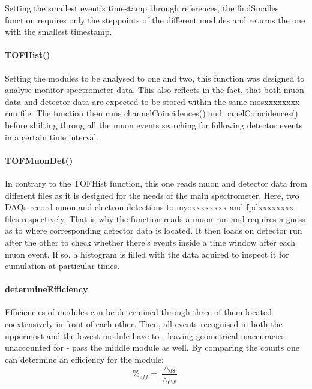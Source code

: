     Setting the smallest event's timestamp through references, the findSmalles function requires only the steppoints of the different modules and returns the one with the smallest timestamp. 
    
    \paragraph{TOFHist()}
    \label{ch:Analysis software:sec:methods of the class run:subsec:TOFHist()}
    
    Setting the modules to be analysed to one and two, this function was designed to analyse monitor spectrometer data. This also reflects in the fact, that both muon data and detector data are expected to be stored within the same mosxxxxxxxx run file. The function then runs channelCoincidences() and panelCoincidences() before shifting throug all the muon events searching for following detector events in a certain time interval.
    
    \paragraph{TOFMuonDet()}
    \label{ch:Analysis software:sec:methods of the class run:subsec:TOFMuonDet()}
    
    In contrary to the TOFHist function, this one reads muon and detector data from different files as it is designed for the needs of the main spectrometer. Here, two DAQs record muon and electron detections to myoxxxxxxxx and fpdxxxxxxxx files respectively. That is why the function reads a muon run and requires a guess as to where corresponding detector data is located. It then loads on detector run after the other to check whether there's events inside a time window after each muon event. If so, a histogram is filled with the data aquired to inspect it for cumulation at particular times. 
    
    \paragraph{determineEfficiency}
    \label{ch:Analysis software:sec:methods of the class run:subsec:determineEfficiency}
    
    Efficiencies of modules can be determined through three of them located coextensively in front of each other. Then, all events recognised in both the uppermost and the lowest module have to - leaving geometrical inaccuracies unaccounted for - pass the middle module as well. By comparing the counts one can determine an efficiency for the module:
    \begin{equation}
    	\%_{eff} = \frac{\wedge_{68}}{{\wedge_{678}}}
    \end{equation}
    
